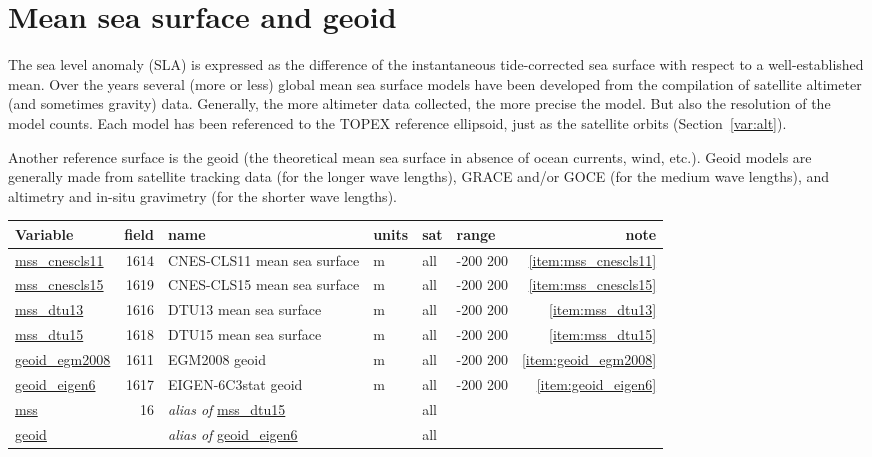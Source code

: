 \documentclass[a4paper,11pt,openany,natbib,nomargin]{thesis}
\makeatletter
\newcommand\var[1]{\url{#1}\index{variables!#1@\protect\url{#1}}}
\newcommand\alias[1]{\emph{alias of} \var{#1}}
\newenvironment{vartable}{
\begin{table}[ht]
\small
\begin{tabular}{lrllllr}
\hline
Variable & field & name & units & sat & range & note \\
\hline
}{
\hline
\end{tabular}
\end{table}
}
\makeatother
\begin{document}
\section{Mean sea surface and geoid}
\label{var:geoid}\label{var:mss}
The sea level anomaly (SLA) is expressed as the difference of the instantaneous tide-corrected sea surface with respect to a well-established mean. Over the years several (more or less) global mean sea surface models have been developed from the compilation of satellite altimeter (and sometimes gravity) data. Generally, the more altimeter data collected, the more precise the model. But also the resolution of the model counts. Each model has been referenced to the TOPEX reference ellipsoid, just as the satellite orbits (Section~\ref{var:alt}).

Another reference surface is the geoid (the theoretical mean sea surface in absence of ocean currents, wind, etc.). Geoid models are generally made from satellite tracking data (for the longer wave lengths), GRACE and/or GOCE (for the medium wave lengths), and altimetry and in-situ gravimetry (for the shorter wave lengths).

\begin{vartable}
\var{mss_cnescls11} & 1614 & CNES-CLS11 mean sea surface & m & all & -200 200 & \ref{item:mss_cnescls11} \\
\var{mss_cnescls15} & 1619 & CNES-CLS15 mean sea surface & m & all & -200 200 & \ref{item:mss_cnescls15} \\
\var{mss_dtu13} & 1616 & DTU13 mean sea surface & m & all & -200 200 & \ref{item:mss_dtu13} \\
\var{mss_dtu15} & 1618 & DTU15 mean sea surface & m & all & -200 200 & \ref{item:mss_dtu15} \\
\var{geoid_egm2008} & 1611 & EGM2008 geoid & m & all & -200 200 & \ref{item:geoid_egm2008} \\
\var{geoid_eigen6} & 1617 & EIGEN-6C3stat geoid & m & all & -200 200 & \ref{item:geoid_eigen6} \\
\hline
\var{mss} & 16 & \alias{mss_dtu15} && all && \\
\var{geoid} && \alias{geoid_eigen6} && all && \\
\end{vartable}
\end{document}
